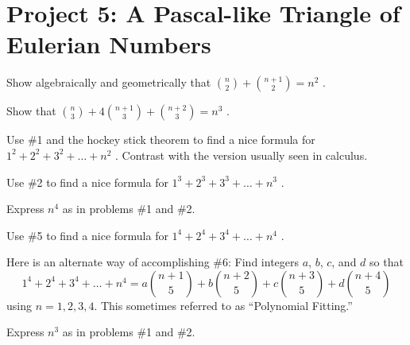 \documentclass[10pt,]{book}
\theoremstyle{plain}
\theoremstyle{definition}
\theoremstyle{definition}
\theoremstyle{definition}
\theoremstyle{definition}
\numberwithin{equation}{chapter}
\begin{document}
\section[{Project 5: A Pascal-like Triangle of Eulerian Numbers}]{Project 5: A Pascal-like Triangle of Eulerian Numbers}\label{exercises-15}
\begin{divisionexercise}{1}\hypertarget{exercise-156}{}
\hypertarget{p-1325}{}%
Show algebraically and geometrically that \(\binom{n}{2}
+
\binom{n + 1}{2}
= n^{2}\) .%
\end{divisionexercise}%
\begin{divisionexercise}{2}\hypertarget{exercise-157}{}
\hypertarget{p-1326}{}%
Show that \(\binom{n}{3}
+ 4
\binom{n + 1}{3}
+
\binom{n + 2}{3}
= n^{3}\) .%
\end{divisionexercise}%
\begin{divisionexercise}{3}\hypertarget{exercise-158}{}
\hypertarget{p-1327}{}%
Use \#1 and the hockey stick theorem to find a nice formula for \(1^{2} + 2^{2} + 3^{2} + \ldots + n^{2}\) . Contrast with the version usually seen in calculus.%
\end{divisionexercise}%
\begin{divisionexercise}{4}\hypertarget{exercise-159}{}
\hypertarget{p-1328}{}%
Use \#2 to find a nice formula for \(1^{3} + 2^{3} + 3^{3} + \ldots + n^{3}\) .%
\end{divisionexercise}%
\begin{divisionexercise}{5}\hypertarget{exercise-160}{}
\hypertarget{p-1329}{}%
Express \(n^{4}\) as in problems \#1 and \#2.%
\end{divisionexercise}%
\begin{divisionexercise}{6}\hypertarget{exercise-161}{}
\hypertarget{p-1330}{}%
Use \#5 to find a nice formula for \(1^{4} + 2^{4} + 3^{4} + \ldots + n^{4}\) .%
\end{divisionexercise}%
\begin{divisionexercise}{7}\hypertarget{exercise-162}{}
\hypertarget{p-1331}{}%
Here is an alternate way of accomplishing \#6:  Find integers \(a\), \(b\), \(c\), and \(d\) so that%
\begin{equation*}
1^{4} + 2^{4} + 3^{4} + \ldots + n^{4} = a\binom{n + 1}{5}  + b\binom{n + 2}{5}  + c\binom{n + 3}{5}  + d\binom{n + 4}{5}
\end{equation*}
using \(n=1, 2, 3, 4\). This sometimes referred to as ``Polynomial Fitting.''%
\end{divisionexercise}%
\begin{divisionexercise}{8}\hypertarget{exercise-163}{}
\hypertarget{p-1332}{}%
Express \(n^{3}\) as in problems \#1 and \#2.%
\end{divisionexercise}%
\end{document}
